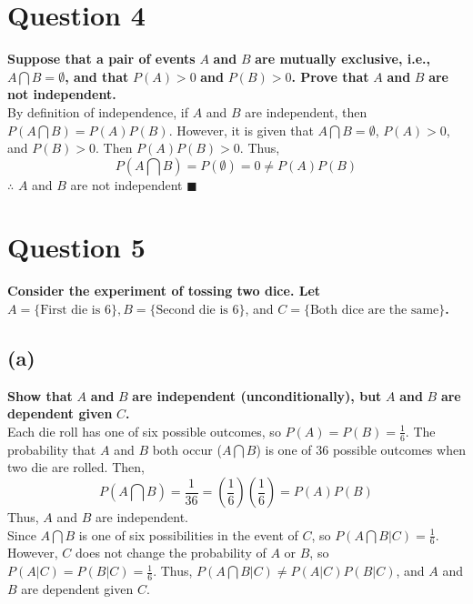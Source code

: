 \documentclass{article}
\newcommand{\intersect}{\bigcap}
\begin{document}

\section*{Question 4}
\textbf{Suppose that a pair of events} $A$ \textbf{and }$B$\textbf{ are mutually exclusive, i.e.,} $A\intersect B=\emptyset$\textbf{, and that} $P(A)>0$\textbf{ and }$P(B)>0$\textbf{. Prove that} $A$ \textbf{and} $B$ \textbf{are not independent.}
\medskip \\
By definition of independence, if $A$ and $B$ are independent, then $P(A\intersect B)=P(A)P(B)$. However, it is given that $A\intersect B=\emptyset$, $P(A)>0$, and $P(B)>0$. Then $P(A)P(B)>0$. Thus,
\[
	P(A\intersect B)=P(\emptyset)=0 \neq P(A)P(B)
\]
$\therefore$ $A$ and $B$ are not independent $\blacksquare$


\section*{Question 5}
\textbf{Consider the experiment of tossing two dice. Let} $A=\{\text{First die is }6\},B=\{\text{Second die is }6\}$, and $C=\{\text{Both dice are the same}\}$\textbf{.}
\subsection*{(a)}
\textbf{Show that} $A$ \textbf{and} $B$ \textbf{are independent (unconditionally), but} $A$ \textbf{and} $B$ \textbf{are dependent given} $C$\textbf{.}
\medskip \\
Each die roll has one of six possible outcomes, so $P(A)=P(B)=\frac{1}{6}$. The probability that $A$ and $B$ both occur ($A\intersect B$) is one of $36$ possible outcomes when two die are rolled. Then,
\[
	P(A\intersect B)=\frac{1}{36}=\left(\frac{1}{6}\right)\left(\frac{1}{6}\right)=P(A)P(B)
\]
Thus, $A$ and $B$ are independent.
\smallskip \\
Since $A\intersect B$ is one of six possibilities in the event of $C$, so $P(A\intersect B|C)=\frac{1}{6}$. However, $C$ does not change the probability of $A$ or $B$, so $P(A|C)=P(B|C)=\frac{1}{6}$. Thus, $P(A\intersect B|C)\neq P(A|C)P(B|C)$, and $A$ and $B$ are dependent given $C$.
\end{document}
